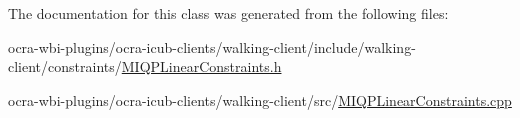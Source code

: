 \-The documentation for this class was generated from the following files\-:\begin{DoxyCompactItemize}
\item 
ocra-\/wbi-\/plugins/ocra-\/icub-\/clients/walking-\/client/include/walking-\/client/constraints/\hyperlink{MIQPLinearConstraints_8h}{\-M\-I\-Q\-P\-Linear\-Constraints.\-h}\item 
ocra-\/wbi-\/plugins/ocra-\/icub-\/clients/walking-\/client/src/\hyperlink{MIQPLinearConstraints_8cpp}{\-M\-I\-Q\-P\-Linear\-Constraints.\-cpp}\end{DoxyCompactItemize}
